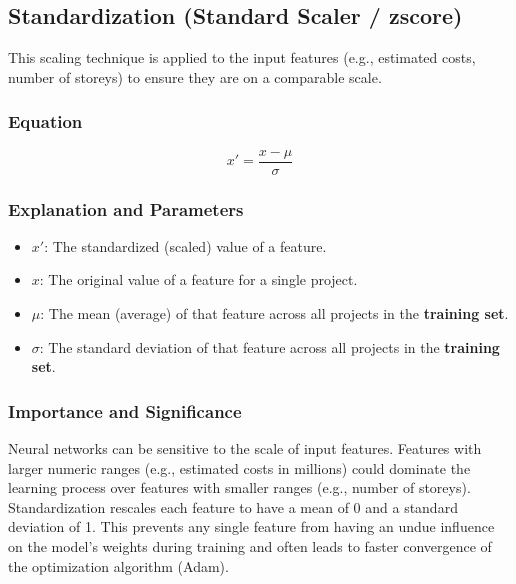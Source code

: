 \documentclass[12pt, a4paper]{article}
\begin{document}
\subsection{Standardization (Standard Scaler / zscore)}
This scaling technique is applied to the input features (e.g., estimated costs, number of storeys) to ensure they are on a comparable scale.

\subsubsection{Equation}
\begin{equation}
x' = \frac{x - \mu}{\sigma}
\label{eq:standardization}
\end{equation}

\subsubsection{Explanation and Parameters}
\begin{itemize}
    \item \textbf{$x'$}: The standardized (scaled) value of a feature.
    \item \textbf{$x$}: The original value of a feature for a single project.
    \item \textbf{$\mu$}: The mean (average) of that feature across all projects in the \textbf{training set}.
    \item \textbf{$\sigma$}: The standard deviation of that feature across all projects in the \textbf{training set}.
\end{itemize}

\subsubsection{Importance and Significance}
Neural networks can be sensitive to the scale of input features. Features with larger numeric ranges (e.g., estimated costs in millions) could dominate the learning process over features with smaller ranges (e.g., number of storeys). Standardization rescales each feature to have a mean of 0 and a standard deviation of 1. This prevents any single feature from having an undue influence on the model's weights during training and often leads to faster convergence of the optimization algorithm (Adam).

\end{document}
